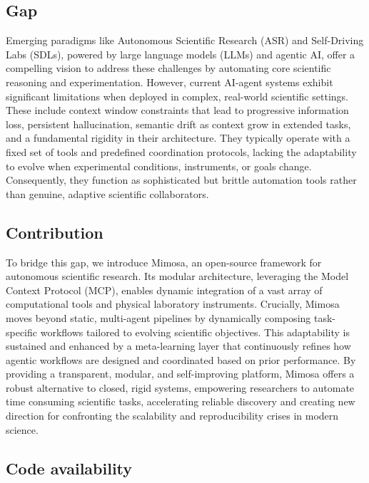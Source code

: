 \documentclass{article}
\begin{document}
\subsection{Gap}


Emerging paradigms like Autonomous Scientific Research (ASR) and Self-Driving Labs (SDLs), powered by large language models (LLMs) and agentic AI, offer a compelling vision to address these challenges by automating core scientific reasoning and experimentation. However, current AI-agent systems exhibit significant limitations when deployed in complex, real-world scientific settings. These include context window constraints that lead to progressive information loss, persistent hallucination, semantic drift as context grow in extended tasks, and a fundamental rigidity in their architecture. They typically operate with a fixed set of tools and predefined coordination protocols, lacking the adaptability to evolve when experimental conditions, instruments, or goals change. Consequently, they function as sophisticated but brittle automation tools rather than genuine, adaptive scientific collaborators.

\subsection{Contribution}


To bridge this gap, we introduce Mimosa, an open-source framework for autonomous scientific research. Its modular architecture, leveraging the Model Context Protocol (MCP), enables dynamic integration of a vast array of computational tools and physical laboratory instruments. Crucially, Mimosa moves beyond static, multi-agent pipelines by dynamically composing task-specific workflows tailored to evolving scientific objectives. This adaptability is sustained and enhanced by a meta-learning layer that continuously refines how agentic workflows are designed and coordinated based on prior performance. By providing a transparent, modular, and self-improving platform, Mimosa offers a robust alternative to closed, rigid systems, empowering researchers to automate time consuming scientific tasks,  accelerating reliable discovery and creating new direction for confronting the scalability and reproducibility crises in modern science.

\subsection{Code availability}
\end{document}

